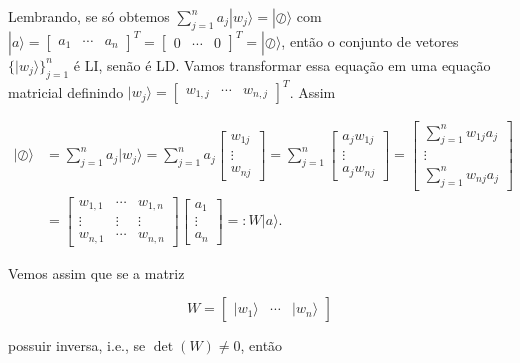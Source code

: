 \documentclass[11pt]{article}
\begin{document}
Lembrando, se só obtemos
\(\sum_{j=1}^{n}a_{j}|w_{j}\rangle=|\oslash\rangle\) com
\(|a\rangle=\begin{bmatrix} a_{1} & \cdots & a_{n} \end{bmatrix}^{T}=\begin{bmatrix} 0 & \cdots & 0 \end{bmatrix}^{T}=|\oslash\rangle\),
então o conjunto de vetores \(\{|w_{j}\rangle\}_{j=1}^{n}\) é LI, senão
é LD. Vamos transformar essa equação em uma equação matricial definindo
\(|w_{j}\rangle=\begin{bmatrix} w_{1,j} & \cdots & w_{n,j} \end{bmatrix}^{T}\).
Assim

\begin{align}
|\oslash\rangle & = \sum_{j=1}^{n}a_{j}|w_{j}\rangle = \sum_{j=1}^{n}a_{j}\begin{bmatrix} w_{1j} \\ \vdots \\ w_{nj} \end{bmatrix} = \sum_{j=1}^{n}\begin{bmatrix} a_{j}w_{1j} \\ \vdots \\ a_{j}w_{nj} \end{bmatrix} = \begin{bmatrix} \sum_{j=1}^{n}w_{1j}a_{j} \\ \vdots \\ \sum_{j=1}^{n}w_{nj}a_{j} \end{bmatrix} \\
& = \begin{bmatrix} w_{1,1} & \cdots & w_{1,n} \\ \vdots & \vdots & \vdots \\  w_{n,1} & \cdots & w_{n,n} \end{bmatrix}\begin{bmatrix} a_{1} \\ \vdots \\ a_{n} \end{bmatrix} =: W|a\rangle.
\end{align}

Vemos assim que se a matriz

\begin{equation}
W=\begin{bmatrix} |w_{1}\rangle & \cdots & |w_{n}\rangle \end{bmatrix}
\end{equation}

possuir inversa, i.e., se \(\det(W)\ne 0\), então
\end{document}
